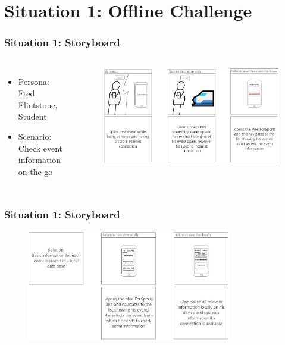 \documentclass[aspectratio=169]{beamer}
\begin{document}
\section{Situation 1:  Offline Challenge}
\begin{frame}   
	\frametitle{Situation 1:  Storyboard}
	\begin{columns}
		\begin{itemize}
			\item Persona: Fred Flintstone, Student
			\item Scenario: Check event information on the go
		\end{itemize}
		 \begin{figure}
			\centering
			\includegraphics[width=1\textwidth]{media/Storyboard_1_1.jpg}
		\end{figure}
	\end{columns}
\end{frame}

\begin{frame}   
	\frametitle{Situation 1:  Storyboard}
	\begin{figure}
		\centering
		\includegraphics[width=0.8\textwidth]{media/Storyboard_1_2.jpg}
	\end{figure}
\end{frame}
\end{document}
